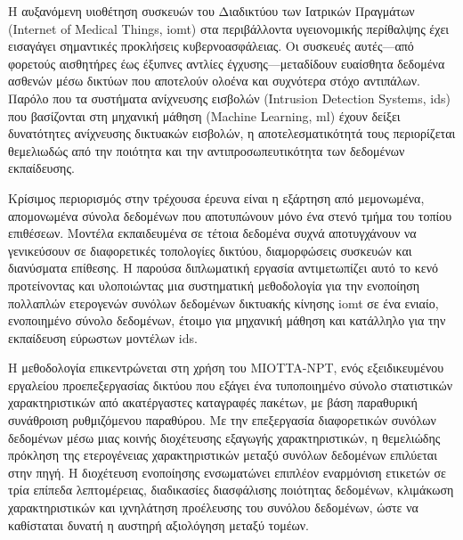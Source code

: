 

Η αυξανόμενη υιοθέτηση συσκευών του Διαδικτύου των Ιατρικών Πραγμάτων
(Internet of Medical Things, \gls{iomt}) στα περιβάλλοντα υγειονομικής περίθαλψης
έχει εισαγάγει σημαντικές προκλήσεις κυβερνοασφάλειας. Οι συσκευές αυτές---από
φορετούς αισθητήρες έως έξυπνες αντλίες έγχυσης---μεταδίδουν ευαίσθητα δεδομένα
ασθενών μέσω δικτύων που αποτελούν ολοένα και συχνότερα στόχο αντιπάλων.
Παρόλο που τα συστήματα ανίχνευσης εισβολών (Intrusion Detection Systems, \gls{ids})
που βασίζονται στη μηχανική μάθηση (Machine Learning, \gls{ml}) έχουν δείξει
δυνατότητες ανίχνευσης δικτυακών εισβολών, η αποτελεσματικότητά τους περιορίζεται
θεμελιωδώς από την ποιότητα και την αντιπροσωπευτικότητα των δεδομένων εκπαίδευσης.

Κρίσιμος περιορισμός στην τρέχουσα έρευνα είναι η εξάρτηση από μεμονωμένα,
απομονωμένα σύνολα δεδομένων που αποτυπώνουν μόνο ένα στενό τμήμα του τοπίου
επιθέσεων. Μοντέλα εκπαιδευμένα σε τέτοια δεδομένα συχνά αποτυγχάνουν να γενικεύσουν
σε διαφορετικές τοπολογίες δικτύου, διαμορφώσεις συσκευών και διανύσματα επίθεσης.
Η παρούσα διπλωματική εργασία αντιμετωπίζει αυτό το κενό προτείνοντας και υλοποιώντας
μια συστηματική μεθοδολογία για την ενοποίηση πολλαπλών ετερογενών συνόλων δεδομένων
δικτυακής κίνησης \gls{iomt} σε ένα ενιαίο, ενοποιημένο σύνολο δεδομένων, έτοιμο για
μηχανική μάθηση και κατάλληλο για την εκπαίδευση εύρωστων μοντέλων \gls{ids}.

Η μεθοδολογία επικεντρώνεται στη χρήση του MIOTTA-NPT, ενός εξειδικευμένου
εργαλείου προεπεξεργασίας δικτύου που εξάγει ένα τυποποιημένο σύνολο στατιστικών
χαρακτηριστικών από ακατέργαστες καταγραφές πακέτων, με βάση παραθυρική συνάθροιση
ρυθμιζόμενου παραθύρου. Με την επεξεργασία διαφορετικών συνόλων δεδομένων μέσω
μιας κοινής διοχέτευσης εξαγωγής χαρακτηριστικών, η θεμελιώδης πρόκληση της
ετερογένειας χαρακτηριστικών μεταξύ συνόλων δεδομένων επιλύεται στην πηγή.
Η διοχέτευση ενοποίησης ενσωματώνει επιπλέον εναρμόνιση ετικετών σε τρία επίπεδα
λεπτομέρειας, διαδικασίες διασφάλισης ποιότητας δεδομένων, κλιμάκωση χαρακτηριστικών
και ιχνηλάτηση προέλευσης του συνόλου δεδομένων, ώστε να καθίσταται δυνατή η αυστηρή
αξιολόγηση μεταξύ τομέων.

